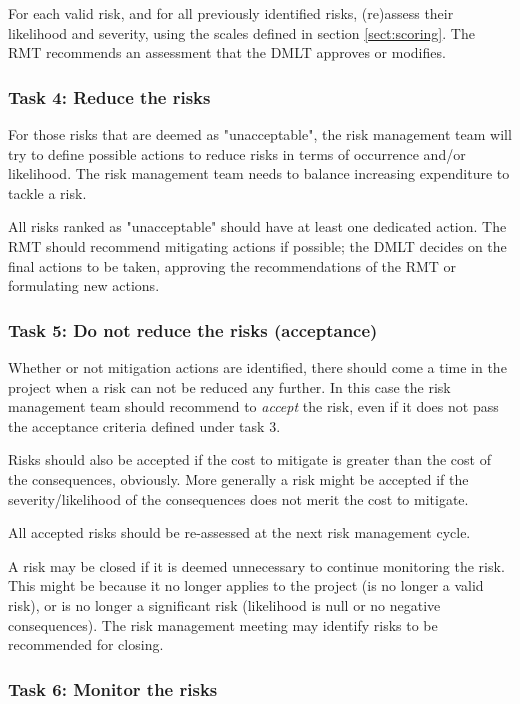 For each valid risk, and for all previously identified risks, (re)assess their likelihood and severity, using the scales defined in section \ref{sect:scoring}. The RMT recommends an assessment that the DMLT approves or modifies.

\subsubsection*{Task 4: Reduce the risks}

For those risks that are deemed as "unacceptable", the risk management team will try to define possible actions to reduce risks in terms of occurrence and/or likelihood.
The risk management team needs to balance increasing expenditure to tackle a risk.

All risks ranked as "unacceptable" should have at least one dedicated action.
The RMT should recommend mitigating actions if possible; the DMLT decides on the final actions to be taken, approving the recommendations of the RMT or formulating new actions.

\subsubsection*{Task 5: Do not reduce the risks (acceptance)}

Whether or not mitigation actions are identified, there should come a time in the project when a risk can not be reduced any further. In this case the risk management team should recommend to \emph{accept} the risk, even if it does not pass the acceptance criteria defined under task 3.

Risks should also be accepted if the cost to mitigate is greater than the cost of the consequences, obviously. More generally a risk might be accepted if the severity/likelihood of the consequences does not merit the cost to mitigate.

All accepted risks should be re-assessed at the next risk management cycle.

A risk may be closed if it is deemed unnecessary to continue monitoring the risk. This might be because it no longer applies to the project (is no longer a valid risk), or is no longer a significant risk (likelihood is null or no negative consequences). The risk management meeting may identify risks to be recommended for closing.

\subsubsection*{Task 6: Monitor the risks}

